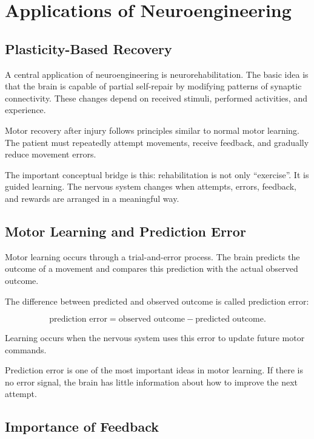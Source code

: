 \section{Applications of Neuroengineering}

\subsection{Plasticity-Based Recovery}

A central application of neuroengineering is neurorehabilitation. The basic idea is that the brain is capable of partial self-repair by modifying patterns of synaptic connectivity. These changes depend on received stimuli, performed activities, and experience.

Motor recovery after injury follows principles similar to normal motor learning. The patient must repeatedly attempt movements, receive feedback, and gradually reduce movement errors.

\begin{authornote}
The important conceptual bridge is this: rehabilitation is not only ``exercise''. It is guided learning. The nervous system changes when attempts, errors, feedback, and rewards are arranged in a meaningful way.
\end{authornote}

\subsection{Motor Learning and Prediction Error}

Motor learning occurs through a trial-and-error process. The brain predicts the outcome of a movement and compares this prediction with the actual observed outcome.

The difference between predicted and observed outcome is called prediction error:

\[
\text{prediction error}
=
\text{observed outcome}
-
\text{predicted outcome}.
\]

Learning occurs when the nervous system uses this error to update future motor commands.

\begin{authornote}
Prediction error is one of the most important ideas in motor learning. If there is no error signal, the brain has little information about how to improve the next attempt.
\end{authornote}

\subsection{Importance of Feedback}


